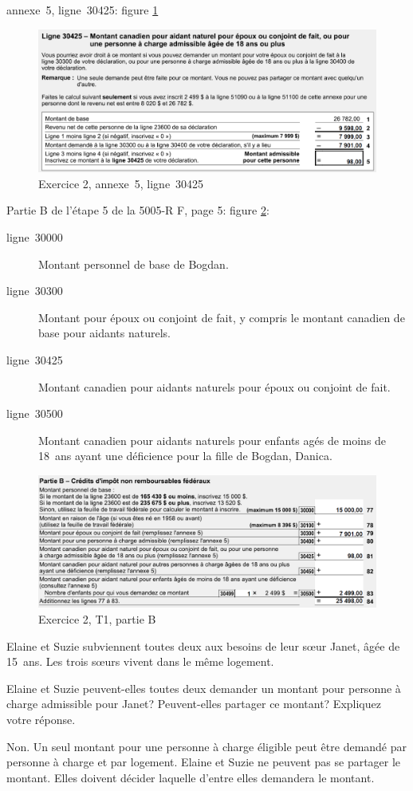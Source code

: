 annexe~5, ligne~30425: figure \ref{fig:chap4Exercice2Q130425}
\begin{figure}
	\centering
	\includegraphics[width=.9\textwidth]{exercice/4-2/Q1/30425.png}
	\caption{Exercice 2, annexe~5, ligne~30425}
	\label{fig:chap4Exercice2Q130425}
\end{figure}

Partie B de l'étape 5 de la 5005-R F, page 5: figure \ref{fig:chap4Exercice2Q1T1B}:
\begin{description}
	\item[ligne~30000] Montant personnel de base de Bogdan.
	\item[ligne~30300] Montant pour époux ou conjoint de fait, y compris le montant canadien de base pour aidants naturels.
	\item[ligne~30425] Montant canadien pour aidants naturels pour époux ou conjoint de fait.
	\item[ligne~30500] Montant canadien pour aidants naturels pour enfants  agés de moins de 18~ans ayant une déficience pour la fille de Bogdan, Danica.
\end{description}
\begin{figure}
	\centering
	\includegraphics[width=.9\textwidth]{exercice/4-2/Q1/T1PartieB.png}
	\caption{Exercice 2, T1, partie B}
	\label{fig:chap4Exercice2Q1T1B}
\end{figure}

\begin{question}
	Elaine et Suzie subviennent toutes deux aux besoins de leur sœur Janet, âgée de 15~ans. Les trois sœurs vivent dans le même logement. 
	
	Elaine et Suzie peuvent-elles toutes deux demander un montant pour personne à charge admissible pour Janet? Peuvent-elles partager ce montant? Expliquez votre réponse.
\end{question}
Non. Un seul montant pour une personne à charge éligible peut être demandé par personne à charge et par logement. Elaine et Suzie ne peuvent pas se partager le montant. Elles doivent décider laquelle d'entre elles demandera le montant.

